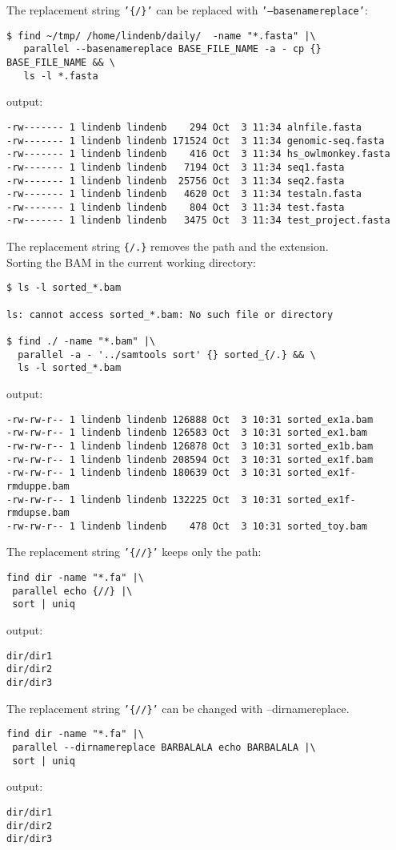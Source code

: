 \documentclass{article}
\begin{document}
The replacement string \texttt{'\{/\}'} can be replaced with \texttt{'--basenamereplace'}:
\begin{lstlisting}
$ find ~/tmp/ /home/lindenb/daily/  -name "*.fasta" |\
   parallel --basenamereplace BASE_FILE_NAME -a - cp {}  BASE_FILE_NAME && \
   ls -l *.fasta
\end{lstlisting}
output:
\begin{lstlisting}
-rw------- 1 lindenb lindenb    294 Oct  3 11:34 alnfile.fasta
-rw------- 1 lindenb lindenb 171524 Oct  3 11:34 genomic-seq.fasta
-rw------- 1 lindenb lindenb    416 Oct  3 11:34 hs_owlmonkey.fasta
-rw------- 1 lindenb lindenb   7194 Oct  3 11:34 seq1.fasta
-rw------- 1 lindenb lindenb  25756 Oct  3 11:34 seq2.fasta
-rw------- 1 lindenb lindenb   4620 Oct  3 11:34 testaln.fasta
-rw------- 1 lindenb lindenb    804 Oct  3 11:34 test.fasta
-rw------- 1 lindenb lindenb   3475 Oct  3 11:34 test_project.fasta
\end{lstlisting}


The replacement string  \texttt{\{/.\}} removes the path and the extension.\\


Sorting the BAM in the current working directory:
\begin{lstlisting}
$ ls -l sorted_*.bam

ls: cannot access sorted_*.bam: No such file or directory

$ find ./ -name "*.bam" |\
  parallel -a - '../samtools sort' {} sorted_{/.} && \
  ls -l sorted_*.bam
\end{lstlisting}
output:
\begin{lstlisting}
-rw-rw-r-- 1 lindenb lindenb 126888 Oct  3 10:31 sorted_ex1a.bam
-rw-rw-r-- 1 lindenb lindenb 126583 Oct  3 10:31 sorted_ex1.bam
-rw-rw-r-- 1 lindenb lindenb 126878 Oct  3 10:31 sorted_ex1b.bam
-rw-rw-r-- 1 lindenb lindenb 208594 Oct  3 10:31 sorted_ex1f.bam
-rw-rw-r-- 1 lindenb lindenb 180639 Oct  3 10:31 sorted_ex1f-rmduppe.bam
-rw-rw-r-- 1 lindenb lindenb 132225 Oct  3 10:31 sorted_ex1f-rmdupse.bam
-rw-rw-r-- 1 lindenb lindenb    478 Oct  3 10:31 sorted_toy.bam
\end{lstlisting}


The replacement string \texttt{'\{//\}'} keeps only the path:
\begin{lstlisting}
find dir -name "*.fa" |\
 parallel echo {//} |\
 sort | uniq
\end{lstlisting}
output:
\begin{lstlisting}
dir/dir1
dir/dir2
dir/dir3
\end{lstlisting}
The replacement string \texttt{'\{//\}'} can be changed with --dirnamereplace.
\begin{lstlisting}
find dir -name "*.fa" |\
 parallel --dirnamereplace BARBALALA echo BARBALALA |\
 sort | uniq
\end{lstlisting}
output:
\begin{lstlisting}
dir/dir1
dir/dir2
dir/dir3
\end{lstlisting}
\end{document}
